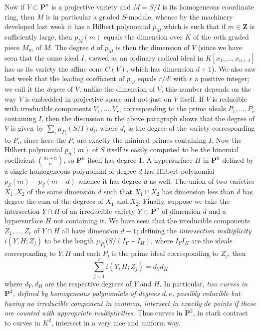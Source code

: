 \documentclass[10pt]{article}
\begin{document}
Now if $V\subset\mathbf P^n$ is a projective variety and $M=S/I$ is its
homogeneous coordinate ring, then $M$ is in particular a graded
$S$-module, whence by the machinery developed last week it has a Hilbert
polynomial $p_M$ which is such that if $m\in\mathbf Z$ is sufficiently
large, then $p_M(m)$ equals the dimension over $K$ of the $m$th graded
piece $M_m$ of $M$. The degree $d$ of $p_M$ is then the dimension of $V$
(since we have seen that the same ideal $I$, viewed as an ordinary
radical ideal in $K[x_1,\ldots,x_{n+1}]$ has as its variety the affine
cone $C(V)$, which has dimension $d+1$). We also saw last week that the
leading coefficient of $p_M$ equals $r/d!$ with $r$ a positive integer;
we call it the {\sl degree} of $V$; unlike the dimension of $V$, this
number depends on the way $V$ is embedded in projective space and not
just on $V$ itself. If $V$ is reducible with irreducible components
$V_1,\ldots,V_r$, corresponding to the prime ideals $P_1,\ldots,P_r$
containing $I$, then the discussion in the above paragraph shows that
the degree of $V$ is given by $\sum_i \mu_{P_i}(S/I) d_i$, where $d_i$
is the degree of the variety corresponding to $P_i$, since here the
$P_i$ are exactly the minimal primes containing $I$. Now the Hilbert
polynomial $p_S(m)$ of $S$ itself is easily computed to be the binomial
coefficient $m+n\choose n$, so $\mathbf P^n$ itself has degree 1. A
hypersurface $H$ in $\mathbf P^n$ defined by a single homogeneous
polynomial of degree $d$ has Hilbert polynomial $p_S(m) - p_S(m-d)$
whence it has degree $d$ as well. The union of two varieties $X_1,X_2$
of the same dimension $d$ such that $X_1\cap X_2$ has dimension less
than $d$ has degree the sum of the degrees of $X_1$ and $X_2$. Finally,
suppose we take the intersection $Y\cap H$ of an irreducible variety
$Y\subset\mathbf P^n$ of dimension $d$ and a hypersurface $H$ not
containing it. We have seen that the irreducible components
$Z_1,\ldots,Z_r$ of $Y\cap H$ all have dimension $d-1$; defining the
{\sl intersection multiplicity} $i(Y,H;Z_j)$ to be the length
$\mu_{P_j}(S/(I_Y + I_H)$, where $I_YI_H$ are the ideals corresponding
to $Y,H$ and each $P_j$ is the prime ideal corresponding to $Z_j$, then
 $$
 \sum_{j=1}^r i(Y,H;Z_j) = d_Y d_H
 $$
 \noindent where $d_Y,d_H$ are the respective degrees of $Y$ and $H$. In
 particular, {\sl two curves in $\mathbf P^2$, defined by homogeneous
   polynomials of degrees $d,e$, possibly reducible but having no
   irreducible component in common, intersect in exactly $de$ points if
   these are counted with appropriate multiplicities}. Thus curves in
 $\mathbf P^2$, in stark contrast to curves in $K^2$, intersect in a
 very nice and uniform way.
\end{document}
